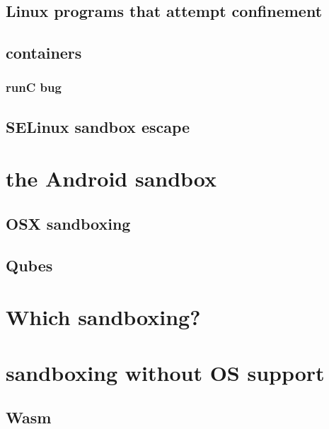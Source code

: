 \subsection{Linux programs that attempt confinement}


\subsection{containers}



\subsubsection{runC bug}


\subsection{SELinux sandbox escape}

\section{the Android sandbox}



\subsection{OSX sandboxing}

\subsection{Qubes}


\section{Which sandboxing?}


\section{sandboxing without OS support}


\subsection{Wasm}



